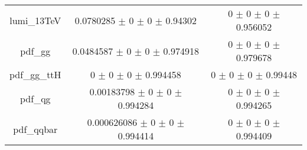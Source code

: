 \begin{table}
\begin{tabular}{ccc}
lumi\_13TeV & \num{0.0780285} $\pm$ \num{0} $\pm$ \num{0} $\pm$ \num{0.94302} & \num{0} $\pm$ \num{0} $\pm$ \num{0} $\pm$ \num{0.956052}\\
pdf\_gg & \num{0.0484587} $\pm$ \num{0} $\pm$ \num{0} $\pm$ \num{0.974918} & \num{0} $\pm$ \num{0} $\pm$ \num{0} $\pm$ \num{0.979678}\\
pdf\_gg\_ttH & \num{0} $\pm$ \num{0} $\pm$ \num{0} $\pm$ \num{0.994458} & \num{0} $\pm$ \num{0} $\pm$ \num{0} $\pm$ \num{0.99448}\\
pdf\_qg & \num{0.00183798} $\pm$ \num{0} $\pm$ \num{0} $\pm$ \num{0.994284} & \num{0} $\pm$ \num{0} $\pm$ \num{0} $\pm$ \num{0.994265}\\
pdf\_qqbar & \num{0.000626086} $\pm$ \num{0} $\pm$ \num{0} $\pm$ \num{0.994414} & \num{0} $\pm$ \num{0} $\pm$ \num{0} $\pm$ \num{0.994409}\\
\bottomrule
\end{tabular}
\end{table}